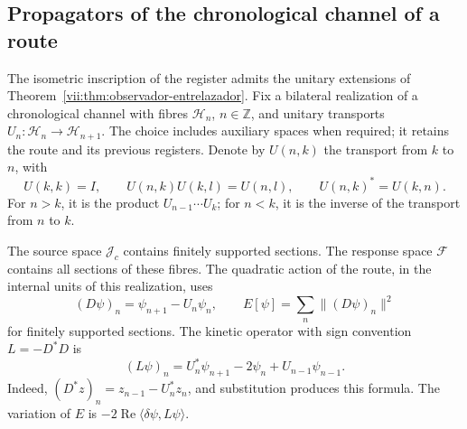 \subsection{Propagators of the chronological channel of a route}
\label{vii:subsec:green-cronologico}

The isometric inscription of the register admits the unitary extensions
of Theorem~\ref{vii:thm:observador-entrelazador}. Fix a bilateral
realization of a chronological channel with fibres \(\mathcal H_n\),
\(n\in\mathbb Z\), and unitary transports
\(U_n:\mathcal H_n\to\mathcal H_{n+1}\).
The choice includes auxiliary spaces when required; it retains
the route and its previous registers. Denote by \(U(n,k)\) the transport
from \(k\) to \(n\), with
\[
 U(k,k)=I,\qquad U(n,k)U(k,l)=U(n,l),\qquad
 U(n,k)^*=U(k,n).
\]
For \(n>k\), it is the product \(U_{n-1}\cdots U_k\); for \(n<k\),
it is the inverse of the transport from \(n\) to \(k\).

The source space \(\mathcal J_c\) contains finitely supported
sections. The response space \(\mathcal F\) contains all
sections of these fibres. The quadratic action of the route, in the internal
units of this realization, uses
\[
 (D\psi)_n=\psi_{n+1}-U_n\psi_n,\qquad
 E[\psi]=\sum_n\|(D\psi)_n\|^2
\]
for finitely supported sections. The kinetic operator with sign
convention \(L=-D^*D\) is
\begin{equation}
 (L\psi)_n=U_n^*\psi_{n+1}-2\psi_n+U_{n-1}\psi_{n-1}.
 \label{vii:eq:diferencia-covariante-bidireccional}
\end{equation}
Indeed, \((D^*z)_n=z_{n-1}-U_n^*z_n\), and substitution produces
this formula. The variation of \(E\) is
\(-2\operatorname{Re}\langle\delta\psi,L\psi\rangle\).

